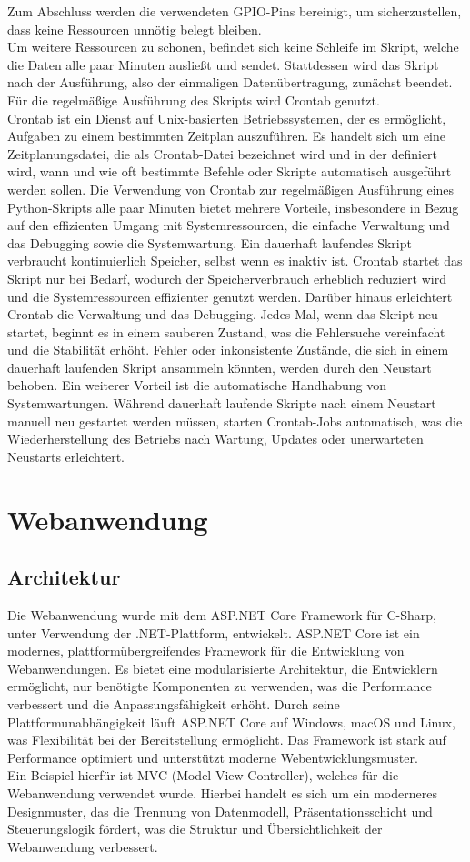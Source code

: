 \documentclass[conference]{IEEEtran}
\begin{document}
Zum Abschluss werden die verwendeten GPIO-Pins bereinigt, um sicherzustellen, dass keine Ressourcen unnötig belegt bleiben. \\
Um weitere Ressourcen zu schonen, befindet sich keine Schleife im Skript, welche die Daten alle paar Minuten ausließt und sendet. Stattdessen wird das Skript nach der Ausführung, also der einmaligen Datenübertragung, zunächst beendet. Für die regelmäßige Ausführung des Skripts wird Crontab genutzt. \\ 
Crontab ist ein Dienst auf Unix-basierten Betriebssystemen, der es ermöglicht, Aufgaben zu einem bestimmten Zeitplan auszuführen. Es handelt sich um eine Zeitplanungsdatei, die als Crontab-Datei bezeichnet wird und in der definiert wird, wann und wie oft bestimmte Befehle oder Skripte automatisch ausgeführt werden sollen. Die Verwendung von Crontab zur regelmäßigen Ausführung eines Python-Skripts alle paar Minuten bietet mehrere Vorteile, insbesondere in Bezug auf den effizienten Umgang mit Systemressourcen, die einfache Verwaltung und das Debugging sowie die Systemwartung. Ein dauerhaft laufendes Skript verbraucht kontinuierlich Speicher, selbst wenn es inaktiv ist. Crontab startet das Skript nur bei Bedarf, wodurch der Speicherverbrauch erheblich reduziert wird und die Systemressourcen effizienter genutzt werden. Darüber hinaus erleichtert Crontab die Verwaltung und das Debugging. Jedes Mal, wenn das Skript neu startet, beginnt es in einem sauberen Zustand, was die Fehlersuche vereinfacht und die Stabilität erhöht. Fehler oder inkonsistente Zustände, die sich in einem dauerhaft laufenden Skript ansammeln könnten, werden durch den Neustart behoben. Ein weiterer Vorteil ist die automatische Handhabung von Systemwartungen. Während dauerhaft laufende Skripte nach einem Neustart manuell neu gestartet werden müssen, starten Crontab-Jobs automatisch, was die Wiederherstellung des Betriebs nach Wartung, Updates oder unerwarteten Neustarts erleichtert.

\section{Webanwendung}
\subsection{Architektur}
Die Webanwendung wurde mit dem ASP.NET Core Framework für C-Sharp, unter Verwendung der .NET-Plattform, entwickelt. ASP.NET Core ist ein modernes, plattformübergreifendes Framework für die Entwicklung von Webanwendungen. Es bietet eine modularisierte Architektur, die Entwicklern ermöglicht, nur benötigte Komponenten zu verwenden, was die Performance verbessert und die Anpassungsfähigkeit erhöht. Durch seine Plattformunabhängigkeit läuft ASP.NET Core auf Windows, macOS und Linux, was Flexibilität bei der Bereitstellung ermöglicht. Das Framework ist stark auf Performance optimiert und unterstützt moderne Webentwicklungsmuster. \\
Ein Beispiel hierfür ist MVC (Model-View-Controller), welches für die Webanwendung verwendet wurde. Hierbei handelt es sich um ein moderneres Designmuster, das die Trennung von Datenmodell, Präsentationsschicht und Steuerungslogik fördert, was die Struktur und Übersichtlichkeit der Webanwendung verbessert.
\end{document}
